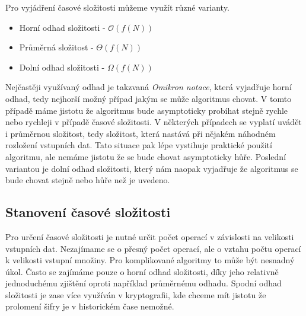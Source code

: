 	 Pro vyjádření časové složitosti můžeme využít různé varianty.
\begin{itemize}
	\item Horní odhad složitosti - $\mathcal{O} (f(N))$
	\item Průměrná složitost - $\Theta (f(N))$
	\item Dolní odhad složitosti - $\Omega (f(N))$
\end{itemize}	
	Nejčastěji využívaný odhad je takzvaná \textit{Omikron notace}, která vyjadřuje horní odhad, tedy nejhorší možný případ jakým se může algoritmus chovat. V tomto případě máme jistotu že algoritmus bude asymptoticky probíhat stejně rychle nebo rychleji v případě časové složitosti. V některých případech se vyplatí uvádět i průměrnou složitost, tedy složitost, která nastává při nějakém náhodném rozložení vstupních dat. Tato situace pak lépe vystihuje praktické použití algoritmu, ale nemáme jistotu že se bude chovat asymptoticky hůře. Poslední variantou je dolní odhad složitosti, který nám naopak vyjadřuje že algoritmus se bude chovat stejně nebo hůře než je uvedeno.
	
\subsection{Stanovení časové složitosti}
	Pro určení časové složitosti je nutné určit počet operací v závislosti na velikosti vstupních dat. Nezajímame se o přesný počet operací, ale o vztahu počtu operací k velikosti vstupní množiny. Pro komplikované algoritmy to může být nesnadný úkol. Často se zajímáme pouze o horní odhad složitosti, díky jeho relativně jednoduchému zjištění oproti například průměrnému odhadu. Spodní odhad složitosti je zase více využíván v kryptografii, kde chceme mít jistotu že prolomení šifry je v historickém čase nemožné.
	
